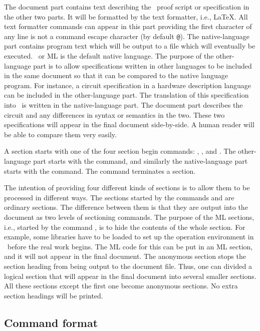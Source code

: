 The document part contains text describing the \HOL\ proof script or
specification in the other
two parts. It will be formatted by the text formatter, i.e., \LaTeX. All text
formatter commands can appear in this part providing the first
character of any line is not a command escape character (by default \verb|@|).
The native-language part contains program text which will be output to
a file which will eventually be executed. \HOL\ or ML is the default
native language. The purpose of the
other-language part is to allow specifications written in other
languages to be included in the same document so that it can be
compared to the native language program. For instance, a circuit
specification in a 
hardware description language can be included in the
other-language part. The translation of this specification into \HOL\ is
written in the native-language part. The document part describes the
circuit and any differences in syntax or semantics in the two.
These two specifications will appear in the final
document side-by-side. A human reader will be able to compare them
very easily.

A section starts with one of the four section begin commands:
, ,
 and . The other-language
part starts with the  command, and similarly the
native-language part starts with the  command.
The command  terminates a section. 

The intention of providing four different kinds of sections is to
allow them to be processed in different ways. The sections started by
the commands  and  are
ordinary sections. The difference between them is that they are output
into the document as two levels of sectioning commands. The purpose of
the ML sections, i.e., started by the command ,
is to hide the contents of the whole section.
For example, some libraries have to be loaded to set up the operation
environment in \HOL\ before the real work begins. The ML code for this
can be put in an ML section, and it will not appear in the final
document. The anonymous section stops the section heading from being output
to the document file. Thus, one can divided a logical section that
will appear in the final document into several smaller sections. All
these sections except the first one become anonymous sections. No
extra section headings will be printed. 


\subsection{Command format}\label{sec-command-format}


